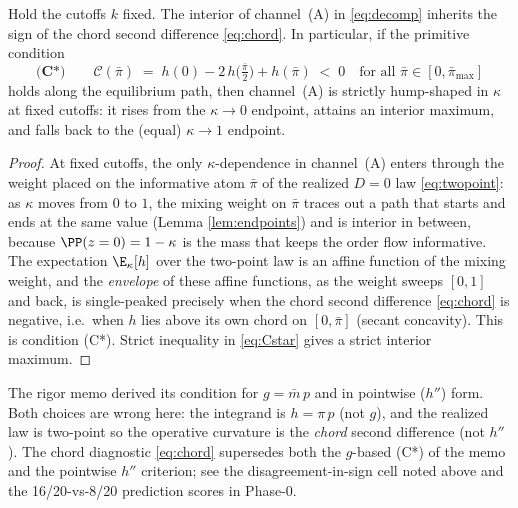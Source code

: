 \begin{lemma}
\label{lem:jensen}
Hold the cutoffs $k$ fixed. The interior of channel~(A) in \eqref{eq:decomp}
inherits the sign of the chord second difference \eqref{eq:chord}. In
particular, if the primitive condition
\begin{equation}
  \textbf{(C*)}\qquad
  \mathcal{C}(\bar\pi)
  \;=\;
  h(0)-2\,h\!\big(\tfrac{\bar\pi}{2}\big)+h(\bar\pi)
  \;<\;0
  \quad\text{for all } \bar\pi\in[0,\bar\pi_{\max}]
  \label{eq:Cstar}
\end{equation}
holds along the equilibrium path, then channel~(A) is strictly hump-shaped in
$\kappa$ at fixed cutoffs: it rises from the $\kappa\to0$ endpoint, attains an
interior maximum, and falls back to the (equal) $\kappa\to1$ endpoint.
\end{lemma}

\begin{proof}
At fixed cutoffs, the only $\kappa$-dependence in channel~(A) enters through
the weight placed on the informative atom $\bar\pi$ of the realized $D=0$ law
\eqref{eq:twopoint}: as $\kappa$ moves from $0$ to $1$, the mixing weight on
$\bar\pi$ traces out a path that starts and ends at the same value (Lemma
\ref{lem:endpoints}) and is interior in between, because
$\PP(z=0)=1-\kappa$ is the mass that keeps the order flow informative. The
expectation $\E_\kappa[h]$ over the two-point law is an affine function of the
mixing weight, and the \emph{envelope} of these affine functions, as the weight
sweeps $[0,1]$ and back, is single-peaked precisely when the chord second
difference \eqref{eq:chord} is negative, i.e.\ when $h$ lies above its own
chord on $[0,\bar\pi]$ (secant concavity). This is condition (C*). Strict
inequality in \eqref{eq:Cstar} gives a strict interior maximum.
\end{proof}

\begin{remark}
The rigor memo derived its condition for $g=\bar m\,p$ and in pointwise
($h''$) form. Both choices are wrong here: the integrand is $h=\pi\,p$ (not
$g$), and the realized law is two-point so the operative curvature is the
\emph{chord} second difference (not $h''$). The chord diagnostic
\eqref{eq:chord} supersedes both the $g$-based (C*) of the memo and the
pointwise $h''$ criterion; see the disagreement-in-sign cell noted above and
the 16/20-vs-8/20 prediction scores in Phase-0.
\end{remark}

